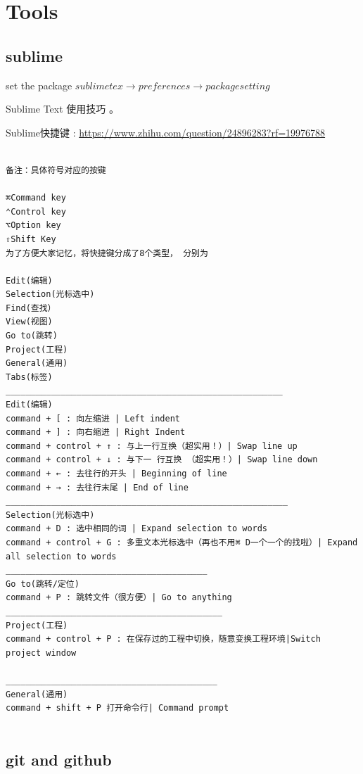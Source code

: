 
\chapter{Tools}
\section{sublime}

set the package $sublime tex \rightarrow preferences \rightarrow package setting$

Sublime Text 使用技巧
。

Sublime快捷键 : \url{https://www.zhihu.com/question/24896283?rf=19976788}

\begin{verbatim}

备注：具体符号对应的按键

⌘Command key
⌃Control key
⌥Option key
⇧Shift Key
为了方便大家记忆，将快捷键分成了8个类型， 分别为

Edit(编辑)
Selection(光标选中)
Find(查找）
View(视图)
Go to(跳转)
Project(工程)
General(通用)
Tabs(标签)
_______________________________________________________
Edit(编辑)
command + [ : 向左缩进 | Left indent
command + ] : 向右缩进 | Right Indent
command + control + ↑ : 与上一行互换（超实用！）| Swap line up
command + control + ↓ : 与下一￼行互换￼（超实用！）| Swap line down
command + ← : 去往行的开头 | Beginning of line
command + → : 去往行末尾 | End of line
________________________________________________________
Selection(光标选中)
command + D : 选中相同的词 | Expand selection to words
command + control + G : 多重文本光标选中（再也不用⌘ D一个一个的找啦）| Expand all selection to words
________________________________________
Go to(跳转/定位)
command + P : 跳转文件（很方便）| Go to anything
___________________________________________
Project(工程)
command + control + P : 在保存过的工程中切换，随意变换工程环境|Switch project window

__________________________________________
General(通用)
command + shift + P 打开命令行| Command prompt


\end{verbatim}




\section{git and github}

